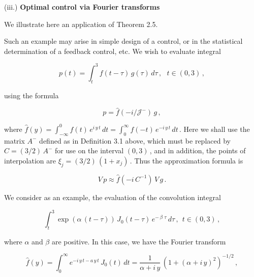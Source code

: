 \documentclass[11pt]{article}
\begin{document}
\begin{description}
\item{(iii.)} {\bf Optimal control via Fourier transforms}

\noindent We illustrate here an application of Theorem 2.5.

\noindent Such an example may arise in simple design of a control, or
in the statistical determination of a feedback control, etc.  We wish
to evaluate integral

\begin{equation}%
  p(t) = \int_t^3 f(t-\tau) \, g(\tau) \, d\tau\,,\ \ \ t \in (0,3)\,,  
  \label{equation:4.8}
\end{equation}

\noindent using the formula

\begin{equation}%
   p = \widehat{f}(-i/{\mathcal J}^-) \, g\,, 
   \label{equation:4.9}
\end{equation}

\noindent where $\widehat{f}(y) = \int_{-\infty}^0 f(t) \, e^{i\,y\,t}
\, dt = \int_0^\infty f(-t) \, e^{-i\,y\,t} \, dt$\,.  Here we shall
use the matrix $A^-$ defined as in Definition 3.1 above, which must be
replaced by $C = (3/2)\,A^-$ for use on the interval $(0,3)$\,, and in
addition, the points of interpolation are $\xi_j = (3/2)\,(1 +
x_j)$\,.  Thus the approximation formula is

\begin{equation}%
  V\,p \approx \widehat{f}(-i\,C^{-1}) \, V\,g\,.
  \label{equation:4.10}
\end{equation}

\vspace{.1in} \noindent We consider as an example, the evaluation of
the convolution integral

\begin{equation}%
  \displaystyle \int_t^3 \exp(\alpha \, (t-\tau)) \, J_0(t-\tau) \,
  e^{-\,\beta\,\,\tau}\,d\tau\,, \ \ t \in (0,3)\,, 
  \label{equation:4.11}
\end{equation}

\noindent where $\alpha$ and $\beta$ are positive.  In this case, we
have the Fourier transform

\begin{equation}%
  \widehat{f}(y) = \displaystyle \int_0^\infty e^{- i\,y\,t - a\,y\,t} \, J_0(t) \,
  dt =  \displaystyle \frac{1}{\alpha + i\,y} \, (1 + (\alpha + i\,y)^2)^{-1/2}\,,
  \label{equation:4.12}
\end{equation}


\end{description}
\end{document}
